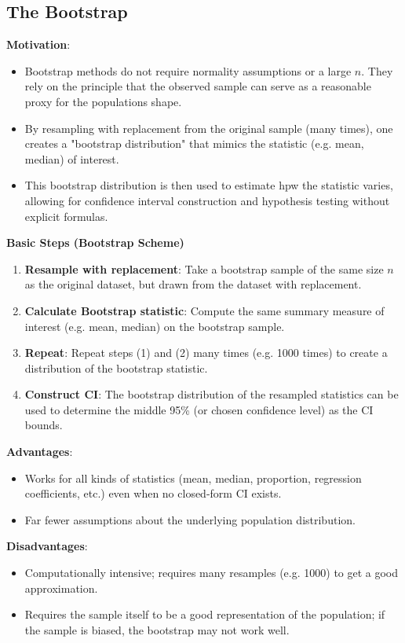 \documentclass[10pt, total={6in, 8in}]{extarticle}
\begin{document}
\subsection{The Bootstrap}
\textbf{Motivation}:
\begin{itemize}
    \item Bootstrap methods do not require normality assumptions or a large $n$. They rely on the principle that the observed sample can serve as a reasonable proxy for the populations shape.
    \item By resampling with replacement from the original sample (many times), one creates a "bootstrap distribution" that mimics the statistic (e.g. mean, median) of interest.
    \item This bootstrap distribution is then used to estimate hpw the statistic varies, allowing for confidence interval construction and hypothesis testing without explicit formulas.
\end{itemize}
\textbf{Basic Steps (Bootstrap Scheme)}
\begin{enumerate}
    \item \textbf{Resample with replacement}: Take a bootstrap sample of the same size $n$ as the original dataset, but drawn from the dataset with replacement.
    \item \textbf{Calculate Bootstrap statistic}: Compute the same summary measure of interest (e.g. mean, median) on the bootstrap sample.
    \item \textbf{Repeat}: Repeat steps (1) and (2) many times (e.g. 1000 times) to create a distribution of the bootstrap statistic.
    \item \textbf{Construct CI}: The bootstrap distribution of the resampled statistics can be used to determine the middle 95\% (or chosen confidence level) as the CI bounds.
\end{enumerate}


\textbf{Advantages}:
\begin{itemize}
    \item Works for all kinds of statistics (mean, median, proportion, regression coefficients, etc.) even when no closed-form CI exists.
    \item Far fewer assumptions about the underlying population distribution.
\end{itemize}
\textbf{Disadvantages}:
\begin{itemize}
    \item Computationally intensive; requires many resamples (e.g. 1000) to get a good approximation.
    \item Requires the sample itself to be a good representation of the population; if the sample is biased, the bootstrap may not work well.
\end{itemize}
\end{document}
